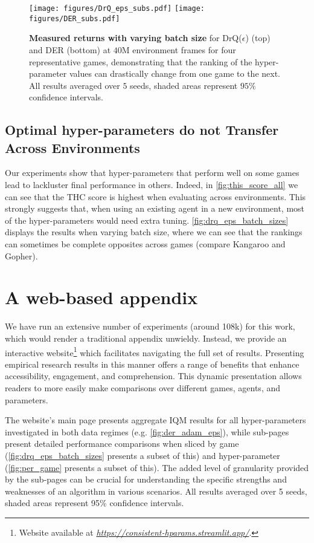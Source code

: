\begin{figure}[!h]
    \centering
  \texttt{[image: figures/DrQ\_eps\_subs.pdf]}
  \texttt{[image: figures/DER\_subs.pdf]}
    \caption{\textbf{Measured returns with varying batch size} for DrQ($\epsilon$) (top) and DER (bottom) at $40$M environment frames for four representative games, demonstrating that the ranking of the hyper-parameter values can drastically change from one game to the next. All results averaged over $5$ seeds, shaded areas represent $95\%$ confidence intervals.
    }%
    \label{fig:drq_eps_batch_sizes}%
\end{figure}


\subsection{Optimal hyper-parameters do not Transfer Across Environments}
\label{sec:acrossEnvironments}
Our experiments show that hyper-parameters that perform well on some games lead to lackluster final performance in others. Indeed, in \autoref{fig:this_score_all} we can see that the THC score is highest when evaluating across environments. This strongly suggests that, when using an existing agent in a new environment, most of the hyper-parameters would need extra tuning.
\autoref{fig:drq_eps_batch_sizes} displays the results when varying batch size, where we can see that the rankings can sometimes be complete opposites across games (compare Kangaroo and Gopher).
 


\section{A web-based appendix} 
\label{web_results}
We have run an extensive number of experiments (around 108k) for this work, which would render a traditional appendix unwieldy. Instead, we provide an interactive website\footnote{Website available at \href{https://consistent-hyperparameters.streamlit.app/}{\emph{https://consistent-hparams.streamlit.app/}}.} which facilitates navigating the full set of results. Presenting empirical research results in this manner offers a range of benefits that enhance accessibility, engagement, and comprehension. 
This dynamic presentation allows readers to more easily make comparisons over different games, agents, and parameters. 


The website's main page presents aggregate IQM results for all hyper-parameters investigated in both data regimes (e.g. \autoref{fig:der_adam_eps}), while sub-pages present detailed performance comparisons when sliced by game (\autoref{fig:drq_eps_batch_sizes} presents a subset of this) and hyper-parameter (\autoref{fig:per_game} presents a subset of this).
The added level of granularity provided by the sub-pages can be crucial for understanding the specific strengths and weaknesses of an algorithm in various scenarios. All results averaged over 5 seeds, shaded areas represent 95\% confidence intervals.


